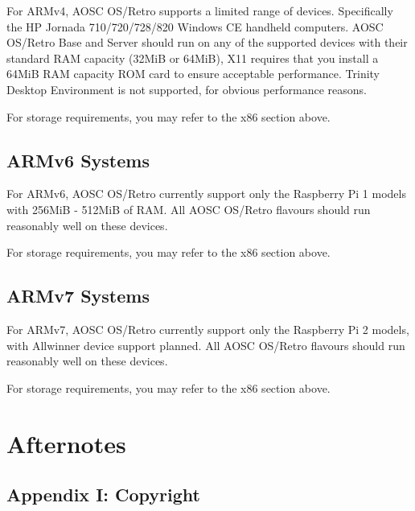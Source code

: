     For ARMv4, AOSC OS/Retro supports a limited range of devices. Specifically the HP Jornada 710/720/728/820 Windows CE handheld computers. AOSC OS/Retro Base and Server should run on any of the supported devices with their standard RAM capacity (32MiB or 64MiB), X11 requires that you install a 64MiB RAM capacity ROM card to ensure acceptable performance. Trinity Desktop Environment is not supported, for obvious performance reasons.

    For storage requirements, you may refer to the x86 section above.

    \section{ARMv6 Systems}

    For ARMv6, AOSC OS/Retro currently support only the Raspberry Pi 1 models with 256MiB - 512MiB of RAM. All AOSC OS/Retro flavours should run reasonably well on these devices.

    For storage requirements, you may refer to the x86 section above.

    \section{ARMv7 Systems}

    For ARMv7, AOSC OS/Retro currently support only the Raspberry Pi 2 models, with Allwinner device support planned. All AOSC OS/Retro flavours should run reasonably well on these devices.

    For storage requirements, you may refer to the x86 section above.



    \chapter{Afternotes}
    
    \section{Appendix I: Copyright}

